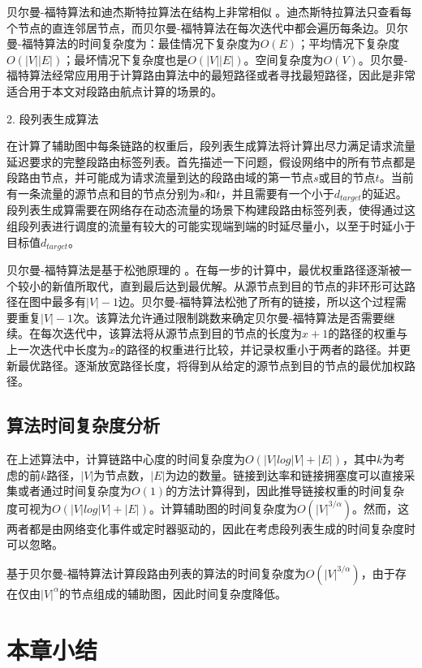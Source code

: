 贝尔曼-福特算法和迪杰斯特拉算法在结构上非常相似 \cite{BFOPTI} 。迪杰斯特拉算法只查看每个节点的直连邻居节点，而贝尔曼-福特算法在每次迭代中都会遍历每条边。贝尔曼-福特算法的时间复杂度为：最佳情况下复杂度为$O(E)$；平均情况下复杂度$O(|V||E|)$；最坏情况下复杂度也是$O(|V||E|)$。空间复杂度为$O(V)$。贝尔曼-福特算法经常应用用于计算路由算法中的最短路径或者寻找最短路径，因此是非常适合用于本文对段路由航点计算的场景的。

2. 段列表生成算法

在计算了辅助图中每条链路的权重后，段列表生成算法将计算出尽力满足请求流量延迟要求的完整段路由标签列表。首先描述一下问题，假设网络中的所有节点都是段路由节点，并可能成为请求流量到达的段路由域的第一节点$s$或目的节点$t$。当前有一条流量的源节点和目的节点分别为$s$和$t$，并且需要有一个小于$d_{target}$的延迟。段列表生成算需要在网络存在动态流量的场景下构建段路由标签列表，使得通过这组段列表进行调度的流量有较大的可能实现端到端的时延尽量小，以至于时延小于目标值$d_{target}$。

贝尔曼-福特算法是基于松弛原理的 \cite{BFOPTI}。在每一步的计算中，最优权重路径逐渐被一个较小的新值所取代，直到最后达到最优解。从源节点到目的节点的非环形可达路径在图中最多有$|V|-1$边。贝尔曼-福特算法松弛了所有的链接，所以这个过程需要重复$|V|-1$次。该算法允许通过限制跳数来确定贝尔曼-福特算法是否需要继续。在每次迭代中，该算法将从源节点到目的节点的长度为$x+1$的路径的权重与上一次迭代中长度为$x$的路径的权重进行比较，并记录权重小于两者的路径。并更新最优路径。逐渐放宽路径长度，将得到从给定的源节点到目的节点的最优加权路径。

\subsection{算法时间复杂度分析}

在上述算法中，计算链路中心度的时间复杂度为$O(|V|log|V|+|E|)$，其中$k$为考虑的前$k$路径，$|V|$为节点数，$|E|$为边的数量。链接到达率和链接拥塞度可以直接采集或者通过时间复杂度为$O(1)$的方法计算得到，因此推导链接权重的时间复杂度可视为$O(|V|log|V|+|E|)$。计算辅助图的时间复杂度为$O({|V|}^{3/\alpha})$。然而，这两者都是由网络变化事件或定时器驱动的，因此在考虑段列表生成的时间复杂度时可以忽略。

基于贝尔曼-福特算法计算段路由列表的算法的时间复杂度为$O({|V|}^{3/\alpha})$，由于存在仅由${|V|}^\alpha$的节点组成的辅助图，因此时间复杂度降低。

\section{本章小结}

